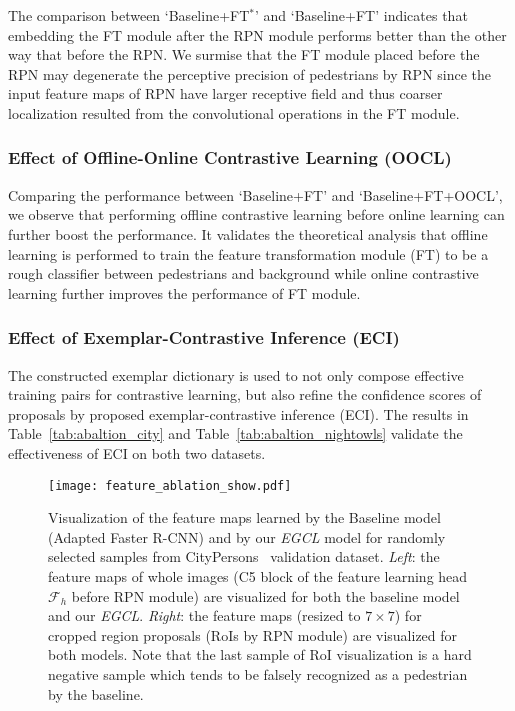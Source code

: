 \documentclass[journal]{IEEEtran}
\begin{document}
The comparison between `Baseline+FT$^*$' and `Baseline+FT' indicates that embedding the FT module after the RPN module performs better than the other way that before the RPN. We surmise that the FT module placed before the RPN may degenerate the perceptive precision of pedestrians by RPN since the input feature maps of RPN have larger receptive field and thus coarser localization resulted from the convolutional operations in the FT module.





\subsubsection{Effect of Offline-Online Contrastive Learning (OOCL)}
Comparing the performance between `Baseline+FT' and `Baseline+FT+OOCL', we observe that performing offline contrastive learning before online learning can further boost the performance. It validates the theoretical analysis that offline learning is performed to train the feature transformation module (FT) to be a rough classifier between pedestrians and background while online contrastive learning further improves the performance of FT module.

\subsubsection{Effect of Exemplar-Contrastive Inference (ECI)}
The constructed exemplar dictionary is used to not only compose effective training pairs for contrastive learning, but also refine the confidence scores of proposals by proposed exemplar-contrastive inference (ECI). The results in Table~\ref{tab:abaltion_city} and Table~\ref{tab:abaltion_nightowls} validate the effectiveness of ECI on both two datasets.
\begin{figure*}[!t]
\centering
    \texttt{[image: feature\_ablation\_show.pdf]}
\caption{Visualization of the feature maps learned by the Baseline model (Adapted Faster R-CNN) and by our \emph{EGCL} model for randomly selected samples from CityPersons~\cite{zhang2017citypersons} validation dataset. \emph{Left}: the feature maps of whole images (C5 block of the feature learning head $\mathcal{F}_h$ before RPN module) are visualized for both the baseline model and our \emph{EGCL}. \emph{Right}: the feature maps (resized to $7\times 7$) for cropped region proposals (RoIs by RPN module) are visualized for both models. Note that the last sample of RoI visualization is a hard negative sample which tends to be falsely recognized as a pedestrian by the baseline.} 
\label{Fig:qualitative_study_rois_no_ped}
\end{figure*}
\end{document}
